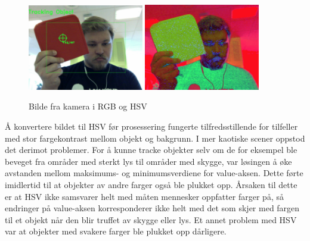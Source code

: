 \begin{figure}[!ht]
	\centering
	{\includegraphics[width=0.45\textwidth]{img/first-rgb.jpg}}
	{\includegraphics[width=0.45\textwidth]{img/first-hsv.jpg}}
	\caption{Bilde fra kamera i RGB og HSV}
\end{figure}

Å konvertere bildet til HSV før prosessering fungerte tilfredsstillende for tilfeller med stor fargekontrast mellom objekt og bakgrunn. I mer kaotiske scener oppstod det derimot problemer. For å kunne tracke objekter selv om de for eksempel ble beveget fra områder med sterkt lys til områder med skygge, var løsingen å øke avstanden mellom maksimums- og minimumsverdiene for value-aksen. Dette førte imidlertid til at objekter av andre farger også ble plukket opp. Årsaken til dette er at HSV ikke samsvarer helt med måten mennesker oppfatter farger på, så endringer på value-aksen korresponderer ikke helt med det som skjer med fargen til et objekt når den blir truffet av skygge eller lys. Et annet problem med HSV var at objekter med svakere farger ble plukket opp dårligere.

